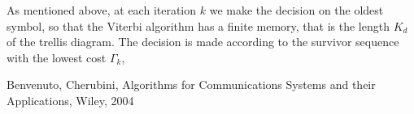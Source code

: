 \documentclass[10pt]{article}
\begin{document}
As mentioned above, at each iteration $k$ we make the decision on the oldest symbol, so that the Viterbi algorithm has a finite memory, that is the length $K_d$ of the trellis diagram. The decision is made according to the survivor sequence with the lowest cost $\Gamma_k$, 





\begin{thebibliography}{10}

Benvenuto, Cherubini, Algorithms for Communications Systems and their Applications, Wiley, 2004

\end{thebibliography}
\end{document}
